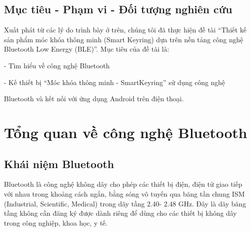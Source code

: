 \subsection{Mục tiêu - Phạm vi - Đối tượng nghiên cứu}

Xuất phát từ các lý do trình bày ở trên, chúng tôi đã thực hiện đề tài “Thiết kế sản phẩm móc khóa thông minh (Smart Keyring) dựa trên nền tảng công nghệ Bluetooth Low Energy (BLE)”. Mục tiêu của đề tài là:

- Tìm hiểu về công nghệ Bluetooth

- Kế thiết bị “Móc khóa thông minh - SmartKeyring” sử dụng công nghệ

Bluetooth và kết nối với ứng dụng Android trên điện thoại.

\nomenclature[g-p]{$\pi$}{ $\simeq 3.14\ldots$}                                             %


\section{Tổng quan về công nghệ Bluetooth} %

\subsection{Khái niệm Bluetooth}
Bluetooth là công nghệ không dây cho phép các thiết bị điện, điện tử giao tiếp với nhau trong khoảng cách ngắn, bằng sóng vô tuyến qua băng tần chung ISM (Industrial, Scientific, Medical) trong dãy tầng 2.40- 2.48 GHz. Đây là dãy băng tầng không cần đăng ký được dành riêng để dùng cho các thiết bị không dây trong công nghiệp, khoa học, y tế.

